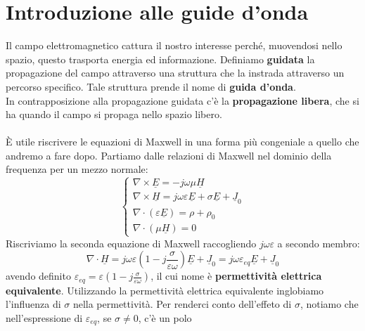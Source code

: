\documentclass{book}
\begin{document}
        \section{Introduzione alle guide d'onda}
            Il campo elettromagnetico cattura il nostro interesse perché, muovendosi nello spazio,
            questo trasporta energia ed informazione. Definiamo \textbf{guidata} la propagazione del campo attraverso
            una struttura che la instrada attraverso un percorso specifico. Tale struttura prende il nome di \textbf{guida d'onda}. \\
            In contrapposizione alla propagazione guidata c'è la \textbf{propagazione libera}, che si ha quando il campo si
            propaga nello spazio libero. \\ \\
            È utile riscrivere le equazioni di Maxwell in una forma più congeniale a quello che andremo a fare dopo.
            Partiamo dalle relazioni di Maxwell nel dominio della frequenza per un mezzo normale:
            \begin{equation}
                \begin{cases}
                \nabla \times \underline{E} = - j \omega \mu \underline{H} \\
                \nabla \times \underline{H} = j \omega \varepsilon \underline{E}+\sigma \underline{E}+\underline{J}_{0} \\
                \nabla \cdot (\varepsilon \underline{E}) = \rho + \rho_{0} \\
                \nabla \cdot (\mu \underline{H}) = 0
                \end{cases}
            \end{equation}
            Riscriviamo la seconda equazione di Maxwell raccogliendo $j \omega \varepsilon$ a secondo membro:
            \begin{equation}
                \nabla \cdot \underline{H} = j \omega \varepsilon(1 - j \frac{\sigma}{\varepsilon \omega})\underline{E}+\underline{J}_{0} = j \omega\varepsilon_{eq}\underline{E}+\underline{J}_{0}
            \end{equation}
            avendo definito $\displaystyle  \varepsilon_{eq} = \varepsilon(1 - j \frac{\sigma}{\varepsilon \omega})$, il cui nome è 
            \textbf{permettività elettrica equivalente}. Utilizzando la permettività elettrica equivalente inglobiamo l'influenza di $\sigma$ nella
            permettività. Per renderci conto dell'effeto di $\sigma$, notiamo che nell'espressione di $\varepsilon_{eq}$, se $\sigma \neq 0$, c'è un polo 
\end{document}
